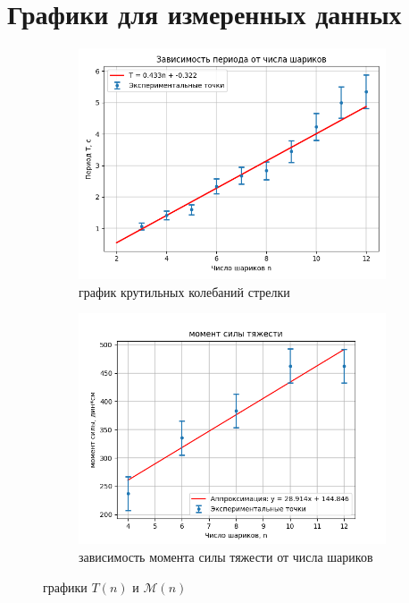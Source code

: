 \documentclass[a4paper, 10pt]{article}
\begin{document}
\section*{Графики для измеренных данных}
    \begin{figure}[htbp]
        \centering
        \begin{subfigure}{0.45\textwidth}
            \includegraphics[width=\linewidth]{period.png}
            \caption{график крутильных колебаний стрелки}
            \label{горизонтальная составляющая}
        \end{subfigure}
        \begin{subfigure}{0.45\textwidth}
            \includegraphics[width=\linewidth]{vertical.png}
            \caption{зависимость момента силы тяжести от числа шариков}
            \label{вертикальная составляющая}
        \end{subfigure}
        \caption{графики $T(n)$ и $\mathcal{M}(n)$}
        \label{графики моментов и периодов}
    \end{figure}
\end{document}
